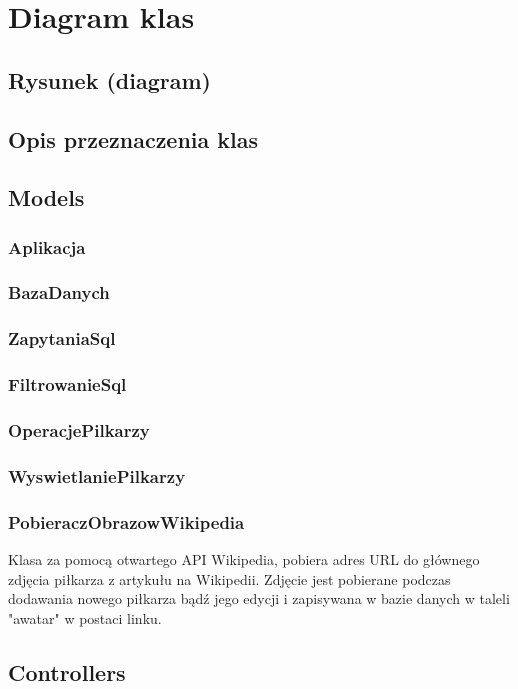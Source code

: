 \section{Diagram klas}
\subsection{Rysunek (diagram)}
\subsection{Opis przeznaczenia klas}


\subsection{Models}
    \subsubsection{Aplikacja}
    \subsubsection{BazaDanych}
    \subsubsection{ZapytaniaSql}
    \subsubsection{FiltrowanieSql}
    \subsubsection{OperacjePilkarzy}
    \subsubsection{WyswietlaniePilkarzy}
    \subsubsection{PobieraczObrazowWikipedia}
        Klasa za pomocą otwartego API Wikipedia, pobiera adres URL do głównego zdjęcia piłkarza z artykułu na Wikipedii. Zdjęcie jest pobierane podczas dodawania nowego piłkarza bądź jego edycji i zapisywana w bazie danych w taleli "awatar" w postaci linku.
    \subsection{Controllers}
